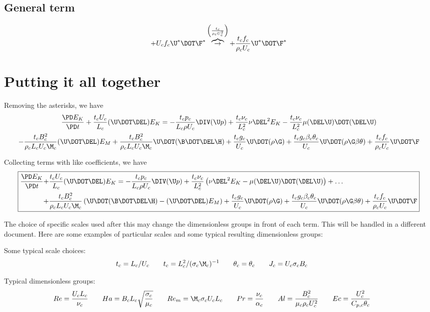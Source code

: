 \documentclass[11pt]{article}
\newcommand{\OB}{\overbrace{\rightarrow}^{\left(\frac{t_c}{\rho_c U_c^2}\right)}}
\begin{document}
\subsection{General term}
\begin{equation}
	+ U_c f_c \U^* \DOT \F^*
	\OB
	+ \frac{t_c f_c}{\rho_c U_c} \U^* \DOT \F^*
\end{equation}

\section{Putting it all together}
Removing the asterisks, we have
\begin{multline}
	\frac{\PD E_K}{\PD t}
	+ \frac{t_c U_c}{L_c} (\U \DOT \DEL) E_K
	=
	- \frac{t_c p_c}{L_c \rho U_c} \DIV (\U p)
	+ \frac{t_c \nu_c}{L_c^2} \nu \DEL^2 E_K
	- \frac{t_c \nu_c}{L_c^2} \mu (\DEL \U) \DOT (\DEL \U)
	\\
	- \frac{t_c B_c^2}{\rho_c L_c U_c \M_c} (\U \DOT \DEL) E_M
	+ \frac{t_c B_c^2}{\rho_c L_c U_c \M_c} \U \DOT (\B \DOT \DEL \H)
	+ \frac{t_c g_c}{U_c} \U \DOT (\rho \G)
	+ \frac{t_c g_c \beta_c \theta_c}{U_c} \U \DOT (\rho \G \beta \theta)
	+ \frac{t_c f_c}{\rho_c U_c} \U \DOT \F
\end{multline}

Collecting terms with like coefficients, we have
\begin{equation}\boxed{\begin{aligned}
	\frac{\PD E_K}{\PD t}
	+ & \frac{t_c U_c}{L_c} (\U \DOT \DEL) E_K
	=
	- \frac{t_c p_c}{L_c \rho U_c} \DIV (\U p)
	+ \frac{t_c \nu_c}{L_c^2}
	\left( \nu \DEL^2 E_K -  \mu (\DEL \U) \DOT (\DEL \U) \right) + \hdots
	\\
	+ & \frac{t_c B_c^2}{\rho_c L_c U_c \M_c}
	\left( \U \DOT (\B \DOT \DEL \H) - (\U \DOT \DEL) E_M \right)
	+ \frac{t_c g_c}{U_c} \U \DOT (\rho \G)
	+ \frac{t_c g_c \beta_c \theta_c}{U_c} \U \DOT (\rho \G \beta \theta)
	+ \frac{t_c f_c}{\rho_c U_c} \U \DOT \F
\end{aligned}}\end{equation}

The choice of specific scales used after this may change the dimensionless groups in front of each term. This will be handled in a different document. Here are some examples of particular scales and some typical resulting dimensionless groups:

Some typical scale choices:
\begin{equation}\begin{aligned}
	t_c = L_c/ U_c \qquad
	t_c = L_c^2/ (\sigma_c \M_c)^{-1} \qquad
	\theta_c = \theta_c \qquad
	J_c = U_c \sigma_c B_c \qquad
\end{aligned}\end{equation}

Typical dimensionless groups:
\begin{equation}
	Re = \frac{U_c L_c}{\nu_c} \qquad
	Ha = B_c L_c \sqrt{\frac{\sigma_c}{\mu_c}} \qquad
	Re_m = \M_c \sigma_c U_c L_c \qquad
	Pr = \frac{\nu_c}{\alpha_c} \qquad
	Al = \frac{B_c^2}{\mu_c \rho_c U_c^2} \qquad
	Ec = \frac{U_c^2}{C_{p,c} \theta_c} \qquad
\end{equation}
\end{document}

